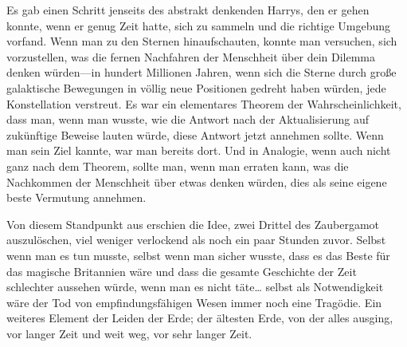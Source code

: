 Es gab einen Schritt jenseits des abstrakt denkenden Harrys, den er gehen konnte, wenn er genug Zeit hatte, sich zu sammeln und die richtige Umgebung vorfand. Wenn man zu den Sternen hinaufschauten, konnte man versuchen, sich vorzustellen, was die fernen Nachfahren der Menschheit über dein Dilemma denken würden—in hundert Millionen Jahren, wenn sich die Sterne durch große galaktische Bewegungen in völlig neue Positionen gedreht haben würden, jede Konstellation verstreut. Es war ein elementares Theorem der Wahrscheinlichkeit, dass man, wenn man wusste, wie die Antwort nach der Aktualisierung auf zukünftige Beweise lauten würde, diese Antwort jetzt annehmen sollte. Wenn man sein Ziel kannte, war man bereits dort. Und in Analogie, wenn auch nicht ganz nach dem Theorem, sollte man, wenn man erraten kann, was die Nachkommen der Menschheit über etwas denken würden, dies als seine eigene beste Vermutung annehmen.

Von diesem Standpunkt aus erschien die Idee, zwei Drittel des Zaubergamot auszulöschen, viel weniger verlockend als noch ein paar Stunden zuvor. Selbst wenn man es tun musste, selbst wenn man sicher wusste, dass es das Beste für das magische Britannien wäre und dass die gesamte Geschichte der Zeit schlechter aussehen würde, wenn man es nicht täte… selbst als Notwendigkeit wäre der Tod von empfindungsfähigen Wesen immer noch eine Tragödie. Ein weiteres Element der Leiden der Erde; der ältesten Erde, von der alles ausging, vor langer Zeit und weit weg, vor sehr langer Zeit.

